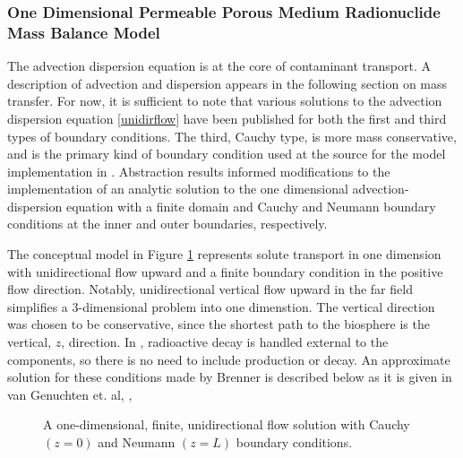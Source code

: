 \subsubsection{One Dimensional Permeable Porous Medium Radionuclide Mass Balance
Model}\label{sec:one_dim_ppm}

The advection dispersion equation is at the core of contaminant transport. A 
description of advection and dispersion appears in the following section on 
mass transfer. For now, it is sufficient to note that various solutions to the advection dispersion equation
\eqref{unidirflow} have been published for both the first and third types of
boundary conditions. The third, Cauchy type, is more mass conservative, and is
the primary kind of boundary condition used at the source for the model
implementation in \Cyder.
Abstraction results informed modifications to the implementation of an
analytic solution to the one dimensional advection-dispersion equation with
a finite domain and Cauchy and Neumann boundary conditions at the inner and outer
boundaries, respectively.

The conceptual model in Figure \ref{fig:1dinf} represents solute transport in
one dimension with unidirectional flow upward and a
finite boundary condition in the positive flow direction.
Notably, unidirectional vertical flow upward in the far field simplifies a 
3-dimensional problem into one dimenstion. The vertical direction was chosen to 
be conservative, since the shortest path to the biosphere is the vertical, $z$, direction.
In \Cyclus, radioactive decay is handled external to the components, so there is
no need to include production or decay.  An approximate solution for these conditions
made by Brenner \cite{brenner_diffusion_1962} is described below as
it is given in van Genuchten et. al, \cite{van_genuchten_analytical_1982},

\FloatBarrier
\vspace{4mm}

\begin{figure}[h!]
  \begin{center}
    \def\svgwidth{0.7\columnwidth}
    
  \end{center}
  \caption[1D finite advection dispersion solution.]{A one-dimensional,
        finite, unidirectional flow solution with Cauchy $(z=0)$ and Neumann 
        $(z=L)$ boundary
        conditions.}
  \label{fig:1dinf}
\end{figure}

